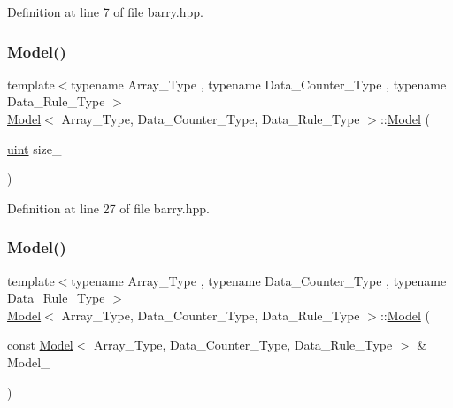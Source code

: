 Definition at line 7 of file barry.\+hpp.

\mbox{\label{classbarry_1_1_model_a46639bb435ca2992dac8858528a5362e}} 
\subsubsection{\texorpdfstring{Model()}{Model()}\hspace{0.1cm}{\footnotesize\ttfamily [2/3]}}
{\footnotesize\ttfamily template$<$typename Array\+\_\+\+Type , typename Data\+\_\+\+Counter\+\_\+\+Type , typename Data\+\_\+\+Rule\+\_\+\+Type $>$ \\
\hyperlink{classbarry_1_1_model}{Model}$<$ Array\+\_\+\+Type, Data\+\_\+\+Counter\+\_\+\+Type, Data\+\_\+\+Rule\+\_\+\+Type $>$\+::\hyperlink{classbarry_1_1_model}{Model} (\begin{DoxyParamCaption}\item[{\hyperlink{namespacebarry_a11dfc53ddb4672278319aa04f1e09a6c}{uint}}]{size\+\_\+ }\end{DoxyParamCaption})\hspace{0.3cm}{\ttfamily [inline]}}



Definition at line 27 of file barry.\+hpp.

\mbox{\label{classbarry_1_1_model_a047905a921baa9e51a4f07d337379375}} 
\subsubsection{\texorpdfstring{Model()}{Model()}\hspace{0.1cm}{\footnotesize\ttfamily [3/3]}}
{\footnotesize\ttfamily template$<$typename Array\+\_\+\+Type , typename Data\+\_\+\+Counter\+\_\+\+Type , typename Data\+\_\+\+Rule\+\_\+\+Type $>$ \\
\hyperlink{classbarry_1_1_model}{Model}$<$ Array\+\_\+\+Type, Data\+\_\+\+Counter\+\_\+\+Type, Data\+\_\+\+Rule\+\_\+\+Type $>$\+::\hyperlink{classbarry_1_1_model}{Model} (\begin{DoxyParamCaption}\item[{const \hyperlink{classbarry_1_1_model}{Model}$<$ Array\+\_\+\+Type, Data\+\_\+\+Counter\+\_\+\+Type, Data\+\_\+\+Rule\+\_\+\+Type $>$ \&}]{Model\+\_\+ }\end{DoxyParamCaption})\hspace{0.3cm}{\ttfamily [inline]}}



